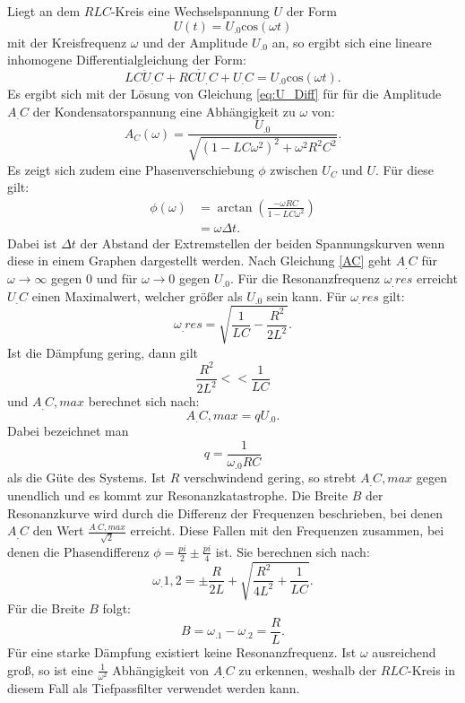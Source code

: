 Liegt an dem $RLC$-Kreis eine Wechselspannung $U$ der Form 
\[
U(t)=U_.0\mathrm{cos}(\omega t)
\]
mit der Kreisfrequenz $\omega$ und der Amplitude $U_.0$ an, so ergibt sich eine lineare inhomogene Differentialgleichung der Form:
\begin{equation}
LC\ddot{U}_.C + RC\dot{U}_.C + U_.C = U_.0\mathrm{cos}(\omega t)\text{.}\label{eq:U_Diff}
\end{equation}
Es ergibt sich mit der Lösung von Gleichung \eqref{eq:U_Diff} für für die Amplitude $A_.C$ der Kondensatorspannung eine Abhängigkeit zu $\omega$ von:
\begin{equation}
A_C(\omega) = \frac{U_.0}{\sqrt{(1-LC\omega^2)^2 + \omega^2R^2C^2}}\text{.}\label{AC}
\end{equation}
Es zeigt sich zudem eine Phasenverschiebung $\phi$ zwischen $U_C$ und $U$. Für diese gilt:
\begin{align}
\phi(\omega) 	&= \arctan\left( \frac{-\omega RC}{1-LC \omega^2}\right)\\
				&= \omega \Delta t\text{.}\label{phi}
\end{align}
Dabei ist $\Delta t$ der Abstand der Extremstellen der beiden Spannungskurven wenn diese in einem Graphen dargestellt werden.\newline
Nach Gleichung \eqref{AC} geht $A_.C$ für $\omega \to \infty$ gegen $0$ und für $\omega \to 0$ gegen $U_.0$.
Für die Resonanzfrequenz $\omega_.{res}$ erreicht $U_.C$ einen Maximalwert, welcher größer als $U_.0$ sein kann. Für $\omega_.{res}$ gilt:
\begin{equation}
\omega_.{res} = \sqrt{\frac{1}{LC}-\frac{R^2}{2L^2}}\text{.}
\end{equation}
Ist die Dämpfung gering, dann gilt
\[
\frac{R^2}{2L^2}<<\frac{1}{LC}
\]
und $A_.{C,max}$ berechnet sich nach:
\begin{equation}
A_.{C,max} = qU_.0\text{.}
\end{equation}
Dabei bezeichnet man 
\begin{equation}
q = \frac{1}{\omega_.0RC}
\end{equation}
als die Güte des Systems. Ist $R$ verschwindend gering, so strebt $A_.{C,max}$ gegen unendlich und es kommt zur Resonanzkatastrophe.\newline
Die Breite $B$ der Resonanzkurve wird durch die Differenz der Frequenzen beschrieben, bei denen $A_.C$ den Wert $\frac{A_.{C,max}}{\sqrt{2}}$ erreicht. Diese Fallen mit den Frequenzen zusammen, bei denen die Phasendifferenz $\phi=\frac{pi}{2}\pm\frac{pi}{4}$ ist. Sie berechnen sich nach:
\begin{equation*}
\omega_.{1,2} = \pm \frac{R}{2L} + \sqrt{\frac{R^2}{4L^2} + \frac{1}{LC}}\text{.}
\end{equation*}
Für die Breite $B$ folgt:
\begin{equation}
B = \omega_.1-\omega_.2 = \frac{R}{L}\text{.}
\end{equation}
Für eine starke Dämpfung existiert keine Resonanzfrequenz. Ist $\omega$ ausreichend groß, so ist eine $\frac{1}{\omega^2}$ Abhängigkeit von $A_.C$ zu erkennen, weshalb der $RLC$-Kreis in diesem Fall als Tiefpassfilter verwendet werden kann. 